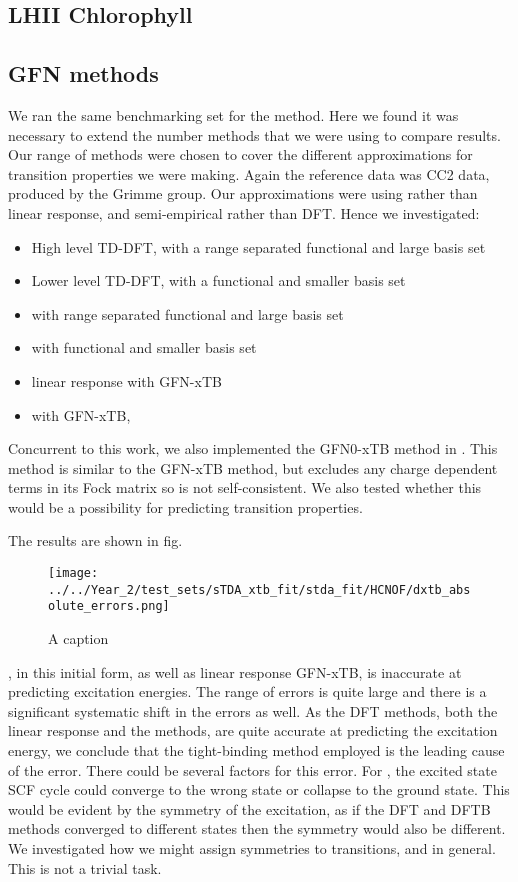 \subsection{LHII Chlorophyll}
\label{subsec:dscf_chl_tests}

\subsection{GFN methods}
\label{subsec:dscf_gfn_tests}
We ran the same benchmarking set for the \dxtb method. Here we found it was 
necessary to extend the number methods that we were using to compare results.
Our range of methods were chosen to cover the different approximations for
transition properties we were making. Again the reference data was CC2 data, 
produced by the Grimme group. Our approximations were using \dscf rather than
linear response, and semi-empirical rather than DFT. Hence we investigated:
\begin{itemize}
    \item High level TD-DFT, with a range separated functional and large basis set
    \item Lower level TD-DFT, with a functional and smaller basis set
    \item \dscf with range separated functional and large basis set
    \item \dscf with functional and smaller basis set
    \item linear response with GFN-xTB
    \item \dscf with GFN-xTB, \dxtb
\end{itemize}

Concurrent to this work, we also implemented the GFN0-xTB method in .
This method is similar to the GFN-xTB method, but excludes any charge dependent
terms in its Fock matrix so is not self-consistent. We also tested whether this
would be a possibility for predicting transition properties.

The results are shown in fig.

\begin{figure}
    \texttt{[image: ../../Year\_2/test\_sets/sTDA\_xtb\_fit/stda\_fit/HCNOF/dxtb\_absolute\_errors.png]}
    \caption{A caption}
\end{figure}

\dxtb, in this initial form, as well as linear response GFN-xTB, is inaccurate 
at predicting excitation energies. The range of errors is quite large and there 
is a significant systematic shift in the errors as well. As the DFT methods, 
both the linear response and the \dscf methods, are quite accurate at predicting
the excitation energy, we conclude that the tight-binding method employed is the
leading cause of the error. 
There could be several factors for this error. For \dxtb, the excited state SCF 
cycle could converge to the wrong state or collapse to the ground state. This
would be evident by the symmetry of the excitation, as if the DFT and DFTB methods
converged to different states then the symmetry would also be different. We 
investigated how we might assign symmetries to \dxtb transitions, and \dscf in 
general. This is not a trivial task. 

